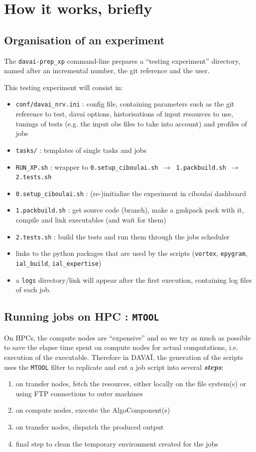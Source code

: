 \documentclass[a4paper,10pt,twoside]{article}
\begin{document}
\newpage
\section{How it works, briefly}
\subsection{Organisation of an experiment}
The \texttt{davai-prep\_xp} command-line prepares a ``testing experiment'' directory, named after an incremental number, the git reference and the user.

\noindent This testing experiment will consist in:
\begin{itemize}
 \item \texttt{conf/davai\_nrv.ini} : config file, containing parameters such as the git reference to test, davai options, historisations of input resources to use, tunings of tests (e.g. the input obs files to take into account) and profiles of jobs
 \item \texttt{tasks/} : templates of single tasks and jobs
 \item \texttt{RUN\_XP.sh} : wrapper to \texttt{0.setup\_ciboulai.sh $\rightarrow$ 1.packbuild.sh $\rightarrow$ 2.tests.sh}
 \item \texttt{0.setup\_ciboulai.sh} : (re-)initialize the experiment in ciboulai dashboard
 \item \texttt{1.packbuild.sh} : get source code (branch), make a gmkpack pack with it, compile and link executables (and wait for them)
 \item \texttt{2.tests.sh} : build the tests and run them through the jobs scheduler
 \item links to the python packages that are used by the scripts (\texttt{vortex}, \texttt{epygram}, \texttt{ial\_build}, \texttt{ial\_expertise})
 \item a \texttt{logs} directory/link will appear after the first execution, containing log files of each job.
\end{itemize}


\subsection{Running jobs on HPC : \texttt{MTOOL}}
On HPCs, the compute nodes are ``expensive'' and so we try as much as possible to save the elapse time spent on compute nodes for actual computations, i.e. execution of the executable.
Therefore in DAVAÏ, the generation of the scripts uses the \texttt{MTOOL} filter to replicate and cut a job script into several \textit{\textbf{steps}}:
\begin{enumerate}[label=(step.0\arabic*)]
 \item on transfer nodes, fetch the resources, either locally on the file system(s) or using FTP connections to outer machines
 \item on compute nodes, execute the AlgoComponent(s)
 \item on transfer nodes, dispatch the produced output
 \item final step to clean the temporary environment created for the jobs
\end{enumerate}
\end{document}
